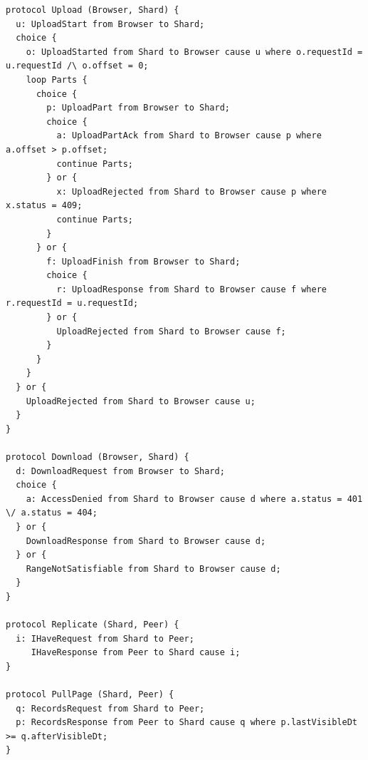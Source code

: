 \begin{Verbatim}[fontsize=\small]
protocol Upload (Browser, Shard) {
  u: UploadStart from Browser to Shard;
  choice {
    o: UploadStarted from Shard to Browser cause u where o.requestId = u.requestId /\ o.offset = 0;
    loop Parts {
      choice {
        p: UploadPart from Browser to Shard;
        choice {
          a: UploadPartAck from Shard to Browser cause p where a.offset > p.offset;
          continue Parts;
        } or {
          x: UploadRejected from Shard to Browser cause p where x.status = 409;
          continue Parts;
        }
      } or {
        f: UploadFinish from Browser to Shard;
        choice {
          r: UploadResponse from Shard to Browser cause f where r.requestId = u.requestId;
        } or {
          UploadRejected from Shard to Browser cause f;
        }
      }
    }
  } or {
    UploadRejected from Shard to Browser cause u;
  }
}

protocol Download (Browser, Shard) {
  d: DownloadRequest from Browser to Shard;
  choice {
    a: AccessDenied from Shard to Browser cause d where a.status = 401 \/ a.status = 404;
  } or {
    DownloadResponse from Shard to Browser cause d;
  } or {
    RangeNotSatisfiable from Shard to Browser cause d;
  }
}

protocol Replicate (Shard, Peer) {
  i: IHaveRequest from Shard to Peer;
     IHaveResponse from Peer to Shard cause i;
}

protocol PullPage (Shard, Peer) {
  q: RecordsRequest from Shard to Peer;
  p: RecordsResponse from Peer to Shard cause q where p.lastVisibleDt >= q.afterVisibleDt;
}
\end{Verbatim}
